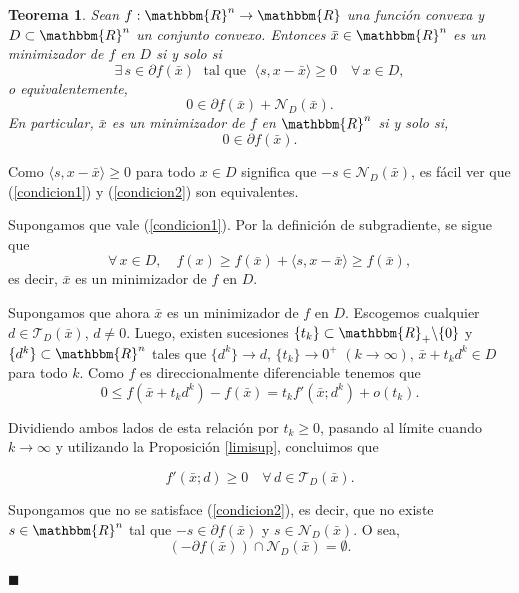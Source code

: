 \documentclass[a4paper,12pt]{report}
\newcommand{\la}{\langle}
\newcommand{\ra}{\rangle}
\newcommand{\RR}{\mathbbm{R}}
\newcommand{\Rn}{\RR^n}
\newcommand{\bx}{\bar{x}}
\newcommand{\sdf}{\partial f(\bx)}
\newcommand{\cN}{\mathcal{N}}
\newcommand{\cT}{\mathcal{T}}
\newcommand{\arr}{\rightarrow}
\newtheorem{teo}{Teorema}[section]
\newenvironment{dem}{\vspace*{-0.1cm}{\it Demostraci\'on:}}{\hfill
$\blacksquare$\\}
\begin{document}
\begin{teo}\label{condminiconv}
Sean $f:\Rn\arr\RR$ una funci\'on convexa y $D\subset\Rn$ un conjunto convexo. Entonces $\bx\in\Rn$ es un minimizador de $f$ en $D$ si y solo si
\begin{equation}\label{condicion1}
\exists\,s\in\partial f(\bx)\;\mbox{ tal que }\;\la s,x-\bx\ra\geq 0\quad \forall\,x\in D,
\end{equation}
o equivalentemente,
\begin{equation}\label{condicion2}
0\in\partial f(\bx)+\cN_{D}(\bx).
\end{equation}
En particular, $\bx$ es un minimizador de $f$ en $\Rn$ si y solo si,
$$ 0\in\partial f(\bx). $$
\end{teo}
\begin{dem}
Como $\la s,x-\bx\ra\geq 0$ para todo $x\in D$ significa que $-s\in\cN_{D}(\bx)$, es f\'acil ver que (\ref{condicion1}) y (\ref{condicion2}) son equivalentes.

Supongamos que vale (\ref{condicion1}). Por la definici\'on de subgradiente, se sigue que
$$\forall\,x\in D,\quad f(x)\geq f(\bx)+\la s,x-\bx\ra \geq f(\bx),$$
es decir, $\bx$ es un minimizador de $f$ en $D$.

Supongamos que ahora $\bx$ es un minimizador de $f$ en $D$. Escogemos cualquier $d\in\cT_{D}(\bx)$, $d\neq 0$. Luego, existen sucesiones $\{t_{k}\}\subset\RR_+\backslash\{0\}$ y $\{d^k\}\subset\Rn$ tales que $\{d^k\}\arr d$, $\{t_k\}\arr 0^+$ $(k\arr\infty)$, $\bx+t_k d^k\in D$ para todo $k$. Como $f$ es direccionalmente diferenciable tenemos que
$$0\leq f(\bx+t_k d^k)-f(\bx)=t_k f'(\bx;d^k)+o(t_k).$$


Dividiendo ambos lados de esta relaci\'on por $t_k\geq 0$, pasando al l\'imite cuando $k\arr\infty$ y utilizando la Proposici\'on \ref{limisup}, concluimos que

\begin{equation}\label{condicion3}
f'(\bx;d)\geq 0\quad\forall\,d\in\cT_{D}(\bx).
\end{equation}

Supongamos que no se satisface (\ref{condicion2}), es decir, que no existe $s\in\Rn$ tal que $-s\in\partial f(\bx)$ y $s\in\cN_{D}(\bx)$. O sea,
$$(-\sdf)\cap\cN_{D}(\bx)=\emptyset.$$


\end{dem}
\end{document}
